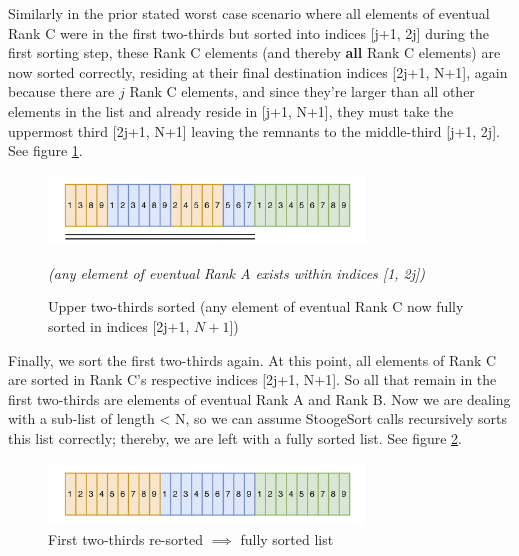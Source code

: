 \documentclass[conference]{styles/acmsiggraph}
\newcommand{\?}{\stackrel{?}{=}}
\begin{document}
Similarly in the prior stated worst case scenario where all elements of eventual Rank C were in the first two-thirds but sorted into indices [j+1, 2j] during the first sorting step, these Rank C elements (and thereby \textbf{all} Rank C elements) are now sorted correctly, residing at their final destination indices [2j+1, N+1], again because there are $j$ Rank C elements, and since they're larger than all other elements in the list and already reside in [j+1, N+1], they must take the uppermost third [2j+1, N+1] leaving the remnants to the middle-third [j+1, 2j].  See figure \ref{fig:sort2}.

\begin{figure}[h]
    \centering
    \includegraphics[width=0.75\textwidth]{StoogeFigures/Sort2.png}
    \caption{Upper two-thirds sorted (any element of eventual Rank C now fully sorted in indices [2j+1, $N+1$])}
    \textit{(any element of eventual Rank A exists within indices [1, 2j])}
    \label{fig:sort2}
\end{figure}
\FloatBarrier

Finally, we sort the first two-thirds again.  At this point, all elements of Rank C are sorted in Rank C's respective indices [2j+1, N+1].  So all that remain in the first two-thirds are elements of eventual Rank A and Rank B.  Now we are dealing with a sub-list of length < N, so we can assume StoogeSort calls recursively sorts this list correctly; thereby, we are left with a fully sorted list. See figure \ref{fig:sorted}.

\begin{figure}[h]
    \centering
    \includegraphics[width=0.75\textwidth]{StoogeFigures/Sorted.png}
    \caption{First two-thirds re-sorted $\implies$ fully sorted list}
    \label{fig:sorted}
\end{figure}
\FloatBarrier
\end{document}
